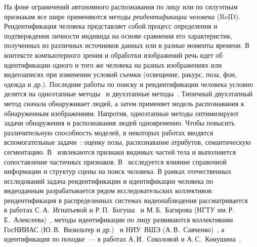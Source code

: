 На фоне ограничений автономного распознавания по лицу или по силуэтным
признакам все шире применяются методы \textit{реидентификации человека}
(ReID). Реидентификация человека представляет собой процесс определения и
подтверждения личности индивида на основе сравнения его характеристик,
полученных из различных источников данных или в разные моменты времени.
В контексте компьютерного зрения и обработки изображений речь идет об
идентификации одного и того же человека на разных изображениях или видеозаписях
при изменении условий съемки (освещение, ракурс, поза, фон, одежда и др.).
Последние работы по поиску и реидентификации человека условно делятся
на одноэтапные методы~\cite{Chang2018rcaa,Chen2020hierarchical,Chen2020normaware} и двухэтапные методы~\cite{Chen2020personsearch,Dong2020personsearch,Han2019reidlocalization}. Типичный
двухэтапный метод сначала обнаруживает людей, а затем применяет модель
распознавания к обнаруженным изображениям. Напротив, одноэтапные методы
оптимизируют задачи обнаружения и распознавания людей одновременно. Чтобы
повысить различительную способность моделей, в некоторых работах вводятся
вспомогательные задачи~\cite{Chen2020personsearch,Chen2022keypoint}: оценку позы, распознавание атрибутов,
семантическую сегментацию. В~\cite{Zhong2020personsearch} извлекаются признаки видимых частей тела и
выполняется сопоставление частичных признаков. В~\cite{Chen2020personsearch} исследуется влияние
справочной информации и структур сцены на поиск человека. В рамках отечественных
исследований задача реидентификации и идентификации человека по видеоданным
разрабатывается рядом исследовательских коллективов: реидентификация
в распределенных системах видеонаблюдения рассматривается в работах
С.\,А.~Игнатьевой и Р.\,П.~Богуша~\cite{Ignatyeva2022polotsk,Ignatyeva2023augment,Ignatyeva2024reid}
и М.\,Б.~Багирова (НГТУ им.\,Р.\,Е.~Алексеева)~\cite{Bagirov2022reid,Bagirov2025tracking},
методы идентификации по лицу развиваются коллективами ГосНИИАС
(Ю.\,В.~Визильтер и др.)~\cite{Vizilter2017face} и НИУ~ВШЭ
(А.\,В.~Савченко)~\cite{Savchenko2017dnn}, а идентификация по походке~---
в работах А.\,И.~Соколовой и А.\,С.~Конушина~\cite{Sokolova2019gait}.

